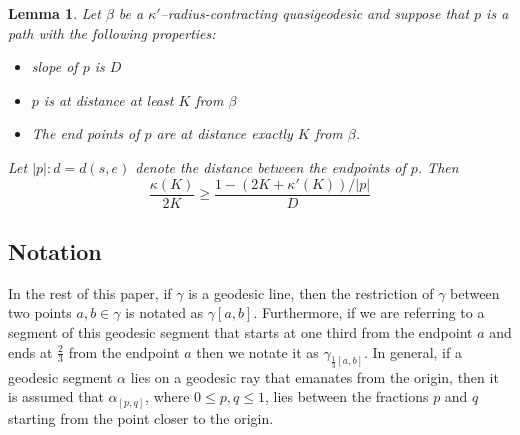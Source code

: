 \documentclass[12 pt]{amsart}
\newtheorem{lemma}[theorem]{Lemma}
\theoremstyle{definition}
\theoremstyle{remark}
\begin{document}
\begin{lemma}
Let $\beta$ be a $\kappa'$–radius-contracting quasigeodesic and suppose that $p$ is a path with the following properties:
\begin{itemize}
\item slope of $p$ is $D$
\item $p$ is at distance at least $K$  from $\beta$
\item The end points of $p$ are at distance exactly $K$ from $\beta$. 
\end{itemize}
Let $|p|: d= d(s, e)$ denote the distance between the endpoints of $p$. Then
\[ \frac{\kappa(K)}{2K} \geq \frac{1-(2K+\kappa'(K))/|p|}{D}\]
\end{lemma}

\subsection*{Notation}In the rest of this paper, if $\gamma$ is a geodesic line, then the restriction of $\gamma$ between two points $a, b\in \gamma$ is notated as $\gamma{[a, b]}$. Furthermore, if we are referring to a segment of this geodesic segment that starts at one third from the endpoint $a$ and ends at $\frac 23$ from the endpoint $a$ then we notate it as $\gamma_{\frac13 [a,b]}$. In general, if a geodesic segment $\alpha$ lies on a geodesic ray that emanates from the origin, then it is assumed that $\alpha_{[p, q]}$, where $0\leq p, q \leq 1$, lies between the fractions $p$ and $q$ starting from the point closer to the origin.
\end{document}
